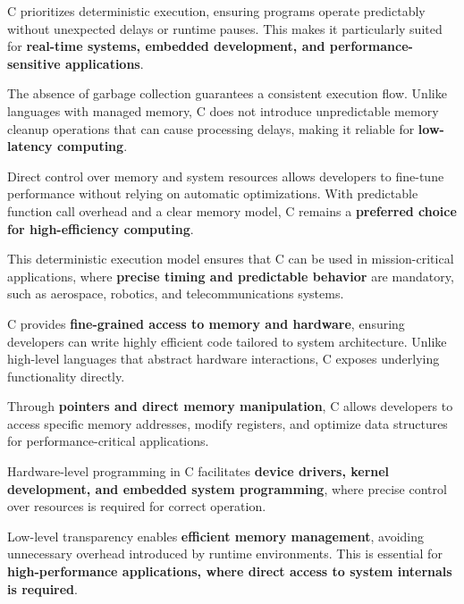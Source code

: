 \begin{NxSSSSBox}
	\begin{NxIDBox}
		C prioritizes deterministic execution, ensuring programs operate predictably without unexpected delays or runtime pauses. This makes it particularly suited for \textbf{real-time systems, embedded development, and performance-sensitive applications}.
	\end{NxIDBox}
	\begin{NxIDBox}
		The absence of garbage collection guarantees a consistent execution flow. Unlike languages with managed memory, C does not introduce unpredictable memory cleanup operations that can cause processing delays, making it reliable for \textbf{low-latency computing}.
	\end{NxIDBox}
	\begin{NxIDBox}
		Direct control over memory and system resources allows developers to fine-tune performance without relying on automatic optimizations. With predictable function call overhead and a clear memory model, C remains a \textbf{preferred choice for high-efficiency computing}.
	\end{NxIDBox}
	\begin{NxIDBox}
		This deterministic execution model ensures that C can be used in mission-critical applications, where \textbf{precise timing and predictable behavior} are mandatory, such as aerospace, robotics, and telecommunications systems.
	\end{NxIDBox}
\end{NxSSSSBox}

\begin{NxSSSSBox}
	\begin{NxIDBox}
		C provides \textbf{fine-grained access to memory and hardware}, ensuring developers can write highly efficient code tailored to system architecture. Unlike high-level languages that abstract hardware interactions, C exposes underlying functionality directly.
	\end{NxIDBox}
	\begin{NxIDBox}
		Through \textbf{pointers and direct memory manipulation}, C allows developers to access specific memory addresses, modify registers, and optimize data structures for performance-critical applications.
	\end{NxIDBox}
	\begin{NxIDBox}
		Hardware-level programming in C facilitates \textbf{device drivers, kernel development, and embedded system programming}, where precise control over resources is required for correct operation.
	\end{NxIDBox}
	\begin{NxIDBox}
		Low-level transparency enables \textbf{efficient memory management}, avoiding unnecessary overhead introduced by runtime environments. This is essential for \textbf{high-performance applications, where direct access to system internals is required}.
	\end{NxIDBox}
\end{NxSSSSBox}


